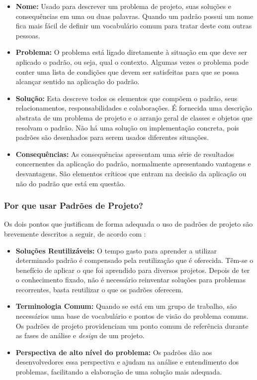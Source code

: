 \begin{itemize}
	\item \textbf{Nome:} Usado para descrever um problema de projeto, suas soluções e consequências em uma ou duas palavras. Quando um padrão possui um nome fica mais fácil de definir um vocabulário comum para tratar deste com outras pessoas.
	\item \textbf{Problema:} O problema está ligado diretamente à situação em que deve ser aplicado o padrão, ou seja, qual o contexto. Algumas vezes o problema pode conter uma lista de condições que devem ser satisfeitas para que se possa alcançar sentido na aplicação do padrão.
	\item \textbf{Solução:} Esta descreve todos os elementos que compõem o padrão, seus relacionamentos, responsabilidades e colaborações. É fornecida uma descrição abstrata de um problema de projeto e o arranjo geral de classes e objetos que resolvam o padrão. Não há uma solução ou implementação concreta, pois padrões são desenhados para serem usados diferentes situações.
	\item \textbf{Consequências:} As consequências apresentam uma série de resultados concernentes da aplicação do padrão, normalmente apresentando vantagens e desvantagens. São elementos críticos que entram na decisão da aplicação ou não do padrão que está em questão.
\end{itemize}

\subsubsection{Por que usar Padrões de Projeto?}

Os dois pontos que justificam de forma adequada o uso de padrões de projeto são brevemente descritos a seguir, de acordo com \cite{Shalloway:Trott:2004}:

\begin{itemize}
	\item \textbf{Soluções Reutilizáveis:} O tempo gasto para aprender a utilizar determinado padrão é compensado pela reutilização que é oferecida. Têm-se o benefício de aplicar o que foi aprendido para diversos projetos. Depois de ter o conhecimento fixado, não é necessário reinventar soluções para problemas recorrentes, basta reutilizar o que os padrões oferecem.
	\item \textbf{Terminologia Comum:} Quando se está em um grupo de trabalho, são necessários uma base de vocabulário e pontos de visão do problema comuns. Os padrões de projeto providenciam um ponto comum de referência durante as fases de análise e \textit{design} de um projeto.
	\item \textbf{Perspectiva de alto nível do problema:} Os padrões dão aos desenvolvedores essa perspectiva e ajudam na análise e entendimento dos problemas, facilitando a elaboração de uma solução mais adequada.
\end{itemize}

